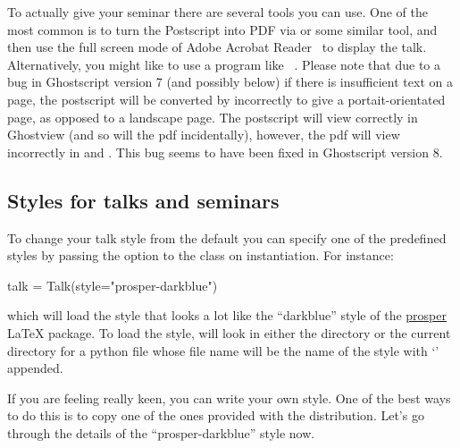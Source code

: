 To actually give your seminar there are several tools you can use.  One of
the most common is to turn the Postscript into PDF via  or some
similar tool, and then use the full screen mode of Adobe Acrobat
Reader~\cite{acroread} to display the talk.  Alternatively, you might like
to use a program like ~\cite{pspresent}.  Please note that
due to a bug in Ghostscript version 7 (and possibly below) if there is
insufficient text on a page, the postscript will be converted by
 incorrectly to give a portait-orientated page, as opposed to a
landscape page.  The postscript will view correctly in Ghostview (and so
will the pdf incidentally), however, the pdf will view incorrectly in
 and .  This bug seems to have been fixed in
Ghostscript version 8.

\subsection{Styles for talks and seminars}
\label{sec:styles}

To change your talk style from the default you can specify one of the
predefined styles by passing the  option to the 
class on instantiation.  For instance:
\begin{python}
talk = Talk(style="prosper-darkblue")
\end{python}
which will load the style that looks a lot like the ``darkblue'' style of
the \href{prosper}{prosper} \LaTeX{} package.  To load the style, \pyscript
will look in either the  directory or the current
directory for a python file whose file name will be the name of the style
with `' appended.

If you are feeling really keen, you can write your own style.  One of the
best ways to do this is to copy one of the ones provided with the \pyscript
distribution.  Let's go through the details of the ``prosper-darkblue''
style now.

